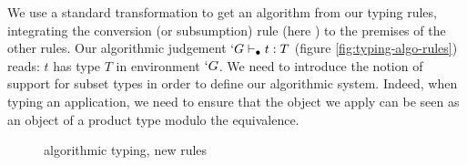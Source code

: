 \documentclass{llncs}
\begin{document}
\begin{paragraph}{}
We use a standard transformation to get an algorithm from our typing
rules, integrating the conversion (or subsumption) rule
(here ) to the premises of the other rules.
Our algorithmic judgement $`G \vdash_{\bullet} t : T$
(figure \vref{fig:typing-algo-rules})
reads: $t$ has type $T$ in environment $`G$.
We need to introduce the notion of support for subset types in order to
define our algorithmic system. Indeed, when typing an application, 
we need to ensure that the object we apply can be seen as an object of a
product type modulo the equivalence. 
\begin{figure*}[t]
  \def\infvspace{0.5em}
    \def\type{\typea}
    \def\subt{\subta}
    \def\sub{\suba}
    \def\fCenter{\typea}
    \begin{center}
    
    
    
    


    \vspace{\infvspace}
    \AppA\DP

    
    \vspace{\infvspace}
    \SumDepA\DP

    \vspace{\infvspace}
    \PiLeftA\DP
    \quad\hspace{-2.5em}
    \PiRightA\DP

  \end{center}
  \vspace{-2em}
  \caption{\Russell{} algorithmic typing, new rules}
  \label{fig:typing-algo-rules}
\end{figure*}


\end{paragraph}
\end{document}
